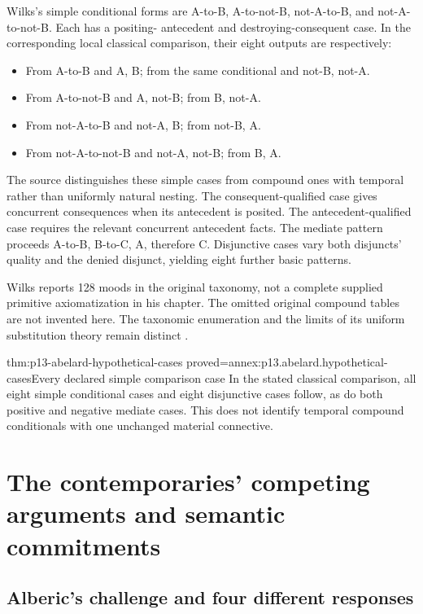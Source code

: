 Wilks's simple conditional forms are A-to-B, A-to-not-B,
not-A-to-B, and not-A-to-not-B. Each has a positing-
antecedent and destroying-consequent case.
In the corresponding local classical comparison, their
eight outputs are respectively:

\begin{itemize}
\item From A-to-B and A, B; from the same conditional and not-B, not-A.
\item From A-to-not-B and A, not-B; from B, not-A.
\item From not-A-to-B and not-A, B; from not-B, A.
\item From not-A-to-not-B and not-A, not-B; from B, A.
\end{itemize}

The source distinguishes these simple cases from compound
ones with temporal rather than uniformly natural nesting.
The consequent-qualified case gives concurrent consequences
when its antecedent is posited. The antecedent-qualified
case requires the relevant concurrent antecedent facts.
The mediate pattern proceeds A-to-B, B-to-C, A, therefore C.
Disjunctive cases vary both disjuncts' quality and the denied
disjunct, yielding eight further basic patterns.

Wilks reports 128 moods in the original taxonomy, not a
complete supplied primitive axiomatization in his chapter.
The omitted original compound tables are not invented here.
The taxonomic enumeration and the limits of its uniform
substitution theory remain distinct
\cite[pp.~140--142]{Wilks2007FordhamAbelard}.

\begin{hblemma}{thm:p13-abelard-hypothetical-cases}
 {proved=annex:p13.abelard.hypothetical-cases}{Every declared simple comparison case}
In the stated classical comparison, all eight simple
conditional cases and eight disjunctive cases follow,
as do both positive and negative mediate cases.
This does not identify temporal compound conditionals
with one unchanged material connective.
\end{hblemma}

\section{The contemporaries' competing arguments and semantic commitments}
\label{sec:p13-abelard-contemporaries}

\subsection{Alberic's challenge and four different responses}

